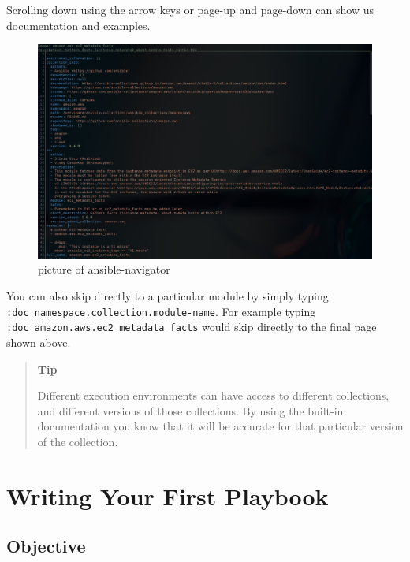 \begin{Shaded}
\begin{Highlighting}[]
\end{Highlighting}
\end{Shaded}

Scrolling down using the arrow keys or page-up and page-down can show us
documentation and examples.

\begin{figure}[H]
\centering
\includegraphics{images/01_interactive-ec2-metadata.png}
\caption{picture of ansible-navigator}
\end{figure}

You can also skip directly to a particular module by simply typing
\texttt{:doc\ namespace.collection.module-name}. For example typing
\texttt{:doc\ amazon.aws.ec2\_metadata\_facts} would skip directly to the final page
shown above.

\begin{quote}
\textbf{Tip}

Different execution environments can have access to different
collections, and different versions of those collections. By using the
built-in documentation you know that it will be accurate for that
particular version of the collection.
\end{quote}

\hypertarget{writing-your-first-playbook}{%
\section{Writing Your First
Playbook}\label{writing-your-first-playbook}}

\hypertarget{objective}{%
\subsection{Objective}\label{objective}}

